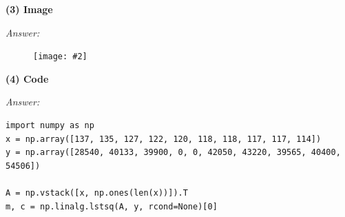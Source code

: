 \documentclass{article}
\newcommand{\newsectiontwo}[1]{
    \textbf{#1}
    \vspace{0.5em}
}
\newcommand{\image}[2]{
	\begin{figure}[!ht]
	\begin{center}
 		 \texttt{[image: \#2]}	
	\end{center}
	\end{figure}
}
\newenvironment{answer}{
	\noindent
	\textit{Answer:}
	
}{\vspace{1em}}
\begin{document}
\begin{CJK}{UTF8}{gbsn}
\newsectiontwo{(3) Image}

\begin{answer}

\image{0.4}{img/NYU.png} %

\end{answer}



\newsectiontwo{(4) Code}

\begin{answer}

\begin{lstlisting}[frame=shadowbox]
import numpy as np
x = np.array([137, 135, 127, 122, 120, 118, 118, 117, 117, 114])            
y = np.array([28540, 40133, 39900, 0, 0, 42050, 43220, 39565, 40400, 54506])

A = np.vstack([x, np.ones(len(x))]).T                                       
m, c = np.linalg.lstsq(A, y, rcond=None)[0]  
\end{lstlisting}

\end{answer}


\newpage

\end{CJK}
\end{document}
